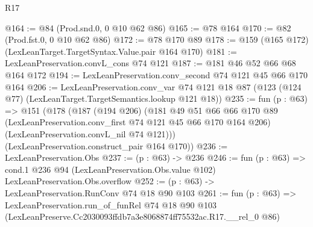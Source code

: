 \begin{lexlean}{R17}
\begin{coremodule}
@164 := @84 (Prod.snd.{0, 0} @10 @62 @86)
@165 := @78 @164
@170 := @82 (Prod.fst.{0, 0} @10 @62 @86)
@172 := @78 @170 @89
@178 := @159 (@165 @172) (LexLeanTarget.TargetSyntax.Value.pair @164 @170)
@181 := LexLeanPreservation.convL_cons @74 @121
@187 := @181 @46 @52 @66 @68 @164 @172
@194 := LexLeanPreservation.conv_second @74 @121 @45 @66 @170 @164
@206 := LexLeanPreservation.conv_var
    @74
    @121
    @18
    @87
    (@123 (@124 @77) (LexLeanTarget.TargetSemantics.lookup @121 @18))
@235 := fun (p : @63) =>
  @151
    (@178
      (@187
        (@194 @206)
        (@181
          @49
          @51
          @66
          @66
          @170
          @89
          (LexLeanPreservation.conv_first @74 @121 @45 @66 @170 @164 @206)
          (LexLeanPreservation.convL_nil @74 @121)))
      (LexLeanPreservation.construct_pair @164 @170))
@236 := LexLeanPreservation.Obs
@237 := (p : @63) -> @236
@246 := fun (p : @63) =>
  cond.{1} @236 @94 (LexLeanPreservation.Obs.value @102) LexLeanPreservation.Obs.overflow
@252 := (p : @63) -> LexLeanPreservation.RunConv @74 @18 @90 @103
@261 := fun (p : @63) =>
  LexLeanPreservation.run_of_funRel
    @74
    @18
    @90
    @103
    (LexLeanPreserve.Cc2030093ffdb7a3e8068874ff75532ac.R17.__rel_0 @86)
\end{coremodule}
\end{lexlean}
